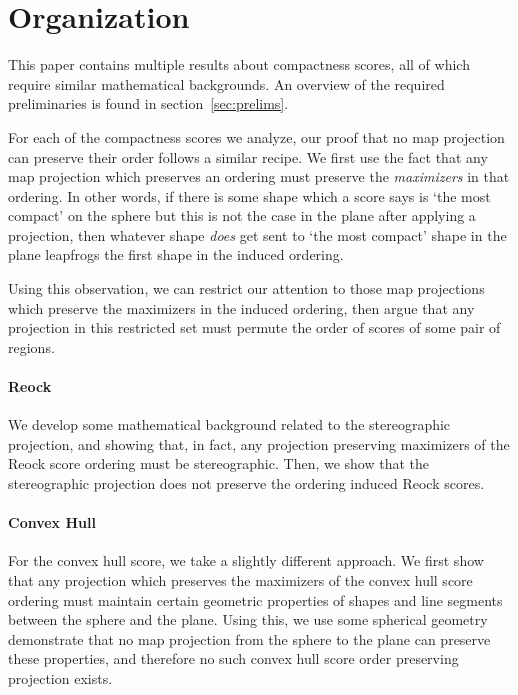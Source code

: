 \section{Organization}
This paper contains multiple results about compactness 
scores, all of which require similar mathematical 
backgrounds. An overview of the required preliminaries 
is found in section~\ref{sec:prelims}.

For each of the compactness scores we analyze, our proof that no map
projection can preserve their order follows a similar recipe. We
first use the fact that any map projection which preserves an ordering
must preserve the \textit{maximizers} in that ordering.  In other words,
if there is some shape which a score says is `the most compact' on the sphere 
but this is not the case in the plane after applying a projection, then whatever 
shape \textit{does} get sent to `the most compact' shape in the plane leapfrogs 
the first shape in the induced ordering.

Using this observation, we can restrict our attention to those map
projections which preserve the maximizers in the induced ordering,
then argue that any projection in this restricted set must permute the
order of scores of some pair of regions.

\paragraph{Reock}
We  develop some mathematical background related to 
the   stereographic projection, and showing 
that, in fact, any projection preserving maximizers 
 of the Reock score ordering must be stereographic. 
Then, we show that the  stereographic 
projection does not preserve the ordering induced Reock scores. 


\paragraph{Convex Hull}
For the convex hull score, we take a slightly different approach.  We first 
show that any projection which preserves the maximizers of the convex hull score 
ordering must maintain certain geometric properties of shapes and line segments 
between the sphere and the plane.  Using this, we use some spherical geometry demonstrate that no 
map projection from the sphere to the plane can preserve these properties, and therefore 
no such convex hull score order preserving projection exists.


